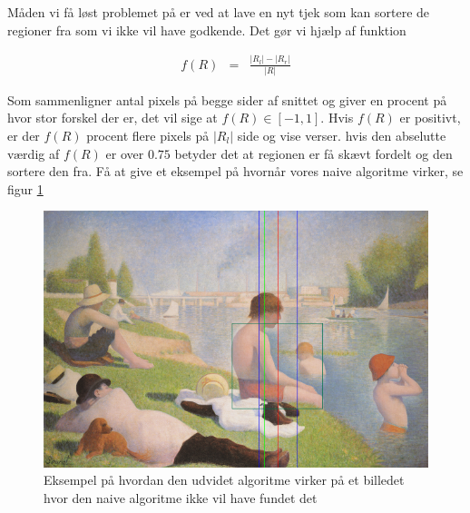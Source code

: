 {Måden vi få løst problemet på er ved at lave en nyt tjek som kan sortere
de regioner fra som vi ikke vil have godkende. Det gør vi hjælp af
funktion

\begin{eqnarray}
    f(R) & = & \frac{|R_{l}| - |R_{r}|}{|R|}
    \label{Fordeling}
\end{eqnarray}

Som sammenligner antal pixels på begge sider af snittet og giver en
procent på hvor stor forskel der er, det vil sige at $f(R) \in [-1,1]$.
Hvis $f(R)$ er positivt, er der $f(R)$ procent flere pixels på $|R_l|$
side og vise verser. hvis den abselutte værdig af $f(R)$ er over $0.75$
betyder det at regionen er få skævt fordelt og den sortere den fra. Få
at give et eksempel på hvornår vores naive algoritme virker, se figur \ref{centerOfMass}
\begin{figure}[h]
	\begin{center}
		\includegraphics[scale=0.35,angle=0]{afsnit/vores_implementation/billeder/udvidet_loesning/centerOfMass.png}
	\end{center}
	\caption[]{Eksempel på hvordan den udvidet algoritme virker på et billedet hvor den naive algoritme ikke vil have fundet det}
	\label{centerOfMass}
\end{figure}

\clearpage

}

